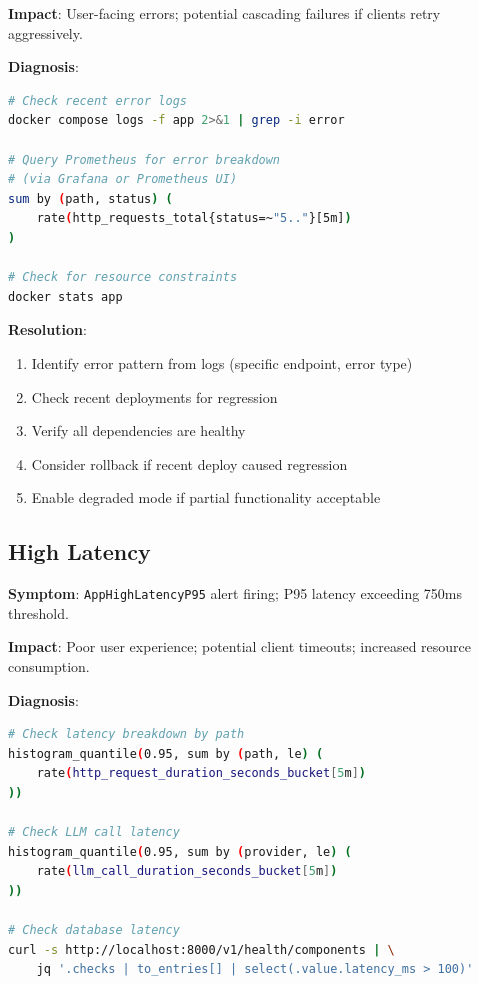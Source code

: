 \textbf{Impact}: User-facing errors; potential cascading failures if clients retry aggressively.

\textbf{Diagnosis}:
\begin{lstlisting}[language=bash, caption={Error rate diagnostic commands}]
# Check recent error logs
docker compose logs -f app 2>&1 | grep -i error

# Query Prometheus for error breakdown
# (via Grafana or Prometheus UI)
sum by (path, status) (
    rate(http_requests_total{status=~"5.."}[5m])
)

# Check for resource constraints
docker stats app
\end{lstlisting}

\textbf{Resolution}:
\begin{enumerate}
    \item Identify error pattern from logs (specific endpoint, error type)
    \item Check recent deployments for regression
    \item Verify all dependencies are healthy
    \item Consider rollback if recent deploy caused regression
    \item Enable degraded mode if partial functionality acceptable
\end{enumerate}

\subsection{High Latency}

\textbf{Symptom}: \texttt{AppHighLatencyP95} alert firing; P95 latency exceeding 750ms threshold.

\textbf{Impact}: Poor user experience; potential client timeouts; increased resource consumption.

\textbf{Diagnosis}:
\begin{lstlisting}[language=bash, caption={Latency diagnostic commands}]
# Check latency breakdown by path
histogram_quantile(0.95, sum by (path, le) (
    rate(http_request_duration_seconds_bucket[5m])
))

# Check LLM call latency
histogram_quantile(0.95, sum by (provider, le) (
    rate(llm_call_duration_seconds_bucket[5m])
))

# Check database latency
curl -s http://localhost:8000/v1/health/components | \
    jq '.checks | to_entries[] | select(.value.latency_ms > 100)'
\end{lstlisting}

